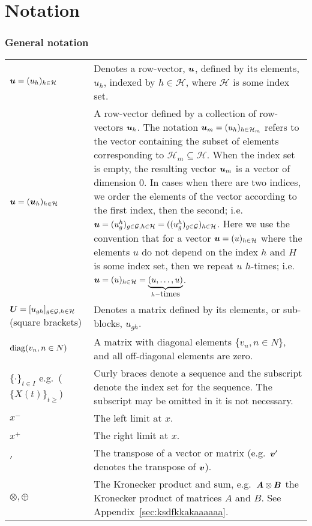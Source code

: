 \chapter*{Notation}
\subsection*{General notation}
\begin{longtable}{p{}p{}}
  \(\boldsymbol u = (u_h)_{h\in \mathcal H}\)
      & Denotes a row-vector, \(\boldsymbol u\), defined by its elements, \(u_h\), indexed by \(h\in\mathcal H\), where \(\mathcal H\) is some index set. \\
  \(\boldsymbol u = (\boldsymbol u_h)_{h\in\mathcal H}\) 
      & A row-vector defined by a collection of row-vectors \(\boldsymbol u_h\). The notation \(\boldsymbol u_m=(u_h)_{h\in\mathcal H_m}\) refers to the vector containing the subset of elements corresponding to \(\mathcal H_m\subseteq \mathcal H\). When the index set is empty, the resulting vector \(\boldsymbol u_m\) is a vector of dimension 0. In cases when there are two indices, we order the elements of the vector according to the first index, then the second; i.e.~\(\boldsymbol u = (u_{g}^h)_{g\in\mathcal G,h\in\mathcal H} = ((u_g^h)_{g\in\mathcal G})_{h\in\mathcal H}\). Here we use the convention that for a vector \(\boldsymbol u=(u)_{h\in \mathcal H}\) where the elements \(u\) do not depend on the index \(h\) and \(H\) is some index set, then we repeat \(u\) \(h\)-times; i.e.~\(\boldsymbol u = (u)_{h\in \mathcal H} =\underbrace{(u,\dots,u)}_{h-\mbox{times}}\). \\
  \(\boldsymbol U = [u_{gh}]_{g\in\mathcal G, h\in\mathcal H}\) (square brackets) 
      & Denotes a matrix defined by its elements, or sub-blocks, \(u_{gh}\). \\
  \(\mathrm{diag}(v_n, n\in N)\) 
      & A matrix with diagonal elements \(\{v_n, n\in N\}\), and all off-diagonal elements are zero. \\
  \(\{\cdot\}_{t\in I}\) e.g.~(\(\{X(t)\}_{t\geq}\))
      & Curly braces denote a sequence and the subscript denote the index set for the sequence. The subscript may be omitted in it is not necessary. \\
  \(x^-\) 
      & The left limit at \(x\). \\ 
  \(x^+\) 
      & The right limit at \(x\). \\ 
  \({}'\) 
      & The transpose of a vector or matrix (e.g.~\(\boldsymbol v'\) denotes the transpose of \(\boldsymbol v\)). \\ 
  \(\otimes, \oplus\) 
      & The Kronecker product and sum, e.g.~\(\boldsymbol A\otimes \boldsymbol B\) the Kronecker product of matrices \(A\) and \(B\). See Appendix~\ref{sec:ksdfkkakaaaaaa}. \\ 
\end{longtable}

